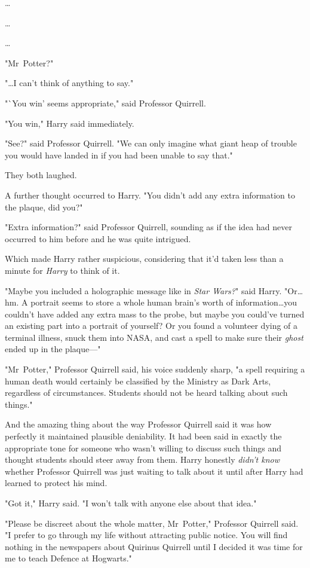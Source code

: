 …

…

…

"Mr~Potter?"

"…I can't think of anything to say."

"`You win' seems appropriate," said Professor Quirrell.

"You win," Harry said immediately.

"See?" said Professor Quirrell. "We can only imagine what giant heap of trouble
you would have landed in if you had been unable to say that."

They both laughed.

A further thought occurred to Harry. "You didn't add any extra information to
the plaque, did you?"

"Extra information?" said Professor Quirrell, sounding as if the idea had never
occurred to him before and he was quite intrigued.

Which made Harry rather suspicious, considering that it'd taken less than a
minute for \emph{Harry} to think of it.

"Maybe you included a holographic message like in \emph{Star Wars?}" said
Harry. "Or…hm. A portrait seems to store a whole human brain's worth of
information…you couldn't have added any extra mass to the probe, but
maybe you could've turned an existing part into a portrait of yourself? Or you
found a volunteer dying of a terminal illness, snuck them into NASA, and cast a
spell to make sure their \emph{ghost} ended up in the plaque---"

"Mr~Potter," Professor Quirrell said, his voice suddenly sharp, "a spell
requiring a human death would certainly be classified by the Ministry as Dark
Arts, regardless of circumstances. Students should not be heard talking about
such things."

And the amazing thing about the way Professor Quirrell said it was how
perfectly it maintained plausible deniability. It had been said in exactly the
appropriate tone for someone who wasn't willing to discuss such things and
thought students should steer away from them. Harry honestly \emph{didn't know}
whether Professor Quirrell was just waiting to talk about it until after Harry
had learned to protect his mind.

"Got it," Harry said. "I won't talk with anyone else about that idea."

"Please be discreet about the whole matter, Mr~Potter," Professor Quirrell
said. "I prefer to go through my life without attracting public notice. You
will find nothing in the newspapers about Quirinus Quirrell until I decided it
was time for me to teach Defence at Hogwarts."

